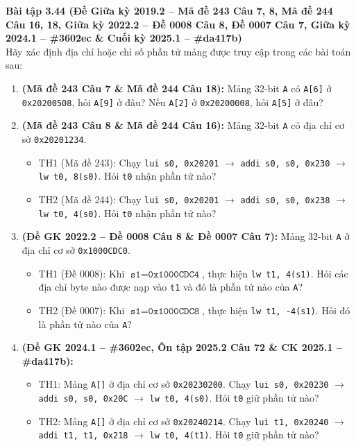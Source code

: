 \textbf{Bài tập 3.44 (Đề Giữa kỳ 2019.2 -- Mã đề 243 Câu 7, 8, Mã đề 244 Câu 16, 18, Giữa kỳ 2022.2 -- Đề 0008 Câu 8, Đề 0007 Câu 7, Giữa kỳ 2024.1 -- \#3602ec \& Cuối kỳ 2025.1 -- \#da417b)}\\
Hãy xác định địa chỉ hoặc chỉ số phần tử mảng được truy cập trong các bài toán sau:
\begin{enumerate}[label=\alph*)]
    \item \textbf{(Mã đề 243 Câu 7 \& Mã đề 244 Câu 18):} Mảng 32-bit \texttt{A} có \texttt{A[6]} ở \texttt{0x20200508}, hỏi \texttt{A[9]} ở đâu? Nếu \texttt{A[2]} ở \texttt{0x20200008}, hỏi \texttt{A[5]} ở đâu?
    \item \textbf{(Mã đề 243 Câu 8 \& Mã đề 244 Câu 16):} Mảng 32-bit \texttt{A} có địa chỉ cơ sở \texttt{0x20201234}.
    \begin{itemize}
        \item TH1 (Mã đề 243): Chạy \texttt{lui s0, 0x20201} $\rightarrow$ \texttt{addi s0, s0, 0x230} $\rightarrow$ \texttt{lw t0, 8(s0)}. Hỏi \texttt{t0} nhận phần tử nào?
        \item TH2 (Mã đề 244): Chạy \texttt{lui s0, 0x20201} $\rightarrow$ \texttt{addi s0, s0, 0x238} $\rightarrow$ \texttt{lw t0, 4(s0)}. Hỏi \texttt{t0} nhận phần tử nào?
    \end{itemize}
    \item \textbf{(Đề GK 2022.2 -- Đề 0008 Câu 8 \& Đề 0007 Câu 7):} Mảng 32-bit \texttt{A} ở địa chỉ cơ sở \texttt{0x1000CDC0}.
    \begin{itemize}
        \item TH1 (Đề 0008): Khi $\texttt{s1} = \texttt{0x1000CDC4}$, thực hiện \texttt{lw t1, 4(s1)}. Hỏi các địa chỉ byte nào được nạp vào \texttt{t1} và đó là phần tử nào của \texttt{A}?
        \item TH2 (Đề 0007): Khi $\texttt{s1} = \texttt{0x1000CDC8}$, thực hiện \texttt{lw t1, -4(s1)}. Hỏi đó là phần tử nào của \texttt{A}?
    \end{itemize}
    \item \textbf{(Đề GK 2024.1 -- \#3602ec, Ôn tập 2025.2 Câu 72 \& CK 2025.1 -- \#da417b):}
    \begin{itemize}
        \item TH1: Mảng \texttt{A[]} ở địa chỉ cơ sở \texttt{0x20230200}. Chạy \texttt{lui s0, 0x20230} $\rightarrow$ \texttt{addi s0, s0, 0x20C} $\rightarrow$ \texttt{lw t0, 4(s0)}. Hỏi \texttt{t0} giữ phần tử nào?
        \item TH2: Mảng \texttt{A[]} ở địa chỉ cơ sở \texttt{0x20240214}. Chạy \texttt{lui t1, 0x20240} $\rightarrow$ \texttt{addi t1, t1, 0x218} $\rightarrow$ \texttt{lw t0, 4(t1)}. Hỏi \texttt{t0} giữ phần tử nào?
    \end{itemize}
\end{enumerate}
